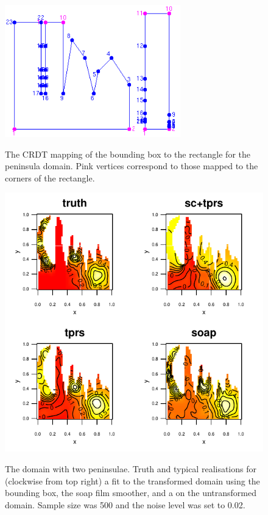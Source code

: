 \begin{figure}
\centering
\includegraphics[width=3in]{sc/figs/wigglytop2-bbox-numbered.png} \\
\caption{The CRDT mapping of the bounding box to the rectangle for the peninsula domain. Pink vertices correspond to those mapped to the corners of the rectangle.}
\label{wigglytop2-bbox-numbered}
\end{figure}


\begin{figure}
\centering
\includegraphics[width=6in]{sc/figs/wigglytop2-bbox-real.pdf} \\
\caption{The domain with two peninsulae. Truth and typical realisations for (clockwise from top right) a \tprs fit to the \sch transformed domain using the bounding box, the soap film smoother, and a \tprs on the untransformed domain. Sample size was 500 and the noise level was set to 0.02.}
\label{wigglytop2-bbox-real}
\end{figure}


